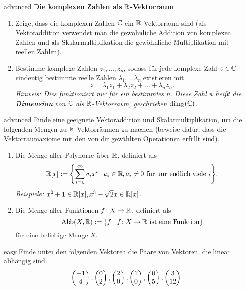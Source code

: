 \documentclass[]{uebungsblatt}
\begin{document}
    \begin{exercise}{advanced}
        \textbf{Die komplexen Zahlen als $\mathbb{R}$-Vektorraum}
        \begin{enumerate}
        \item Zeige, dass die komplexen Zahlen $\mathbb{C}$ ein $\mathbb{R}$-Vektorraum sind (als Vektoraddition verwendet man die
        gewöhnliche Addition von komplexen Zahlen und als Skalarmultiplikation die gewöhnliche Multiplikation mit
        reellen Zahlen).
        \item Bestimme komplexe Zahlen $z_1,\dots,z_n$, sodass für jede komplexe Zahl $z\in\mathbb{C}$ eindeutig bestimmte 
        reelle Zahlen $\lambda_1,\dots\lambda_n$ existieren mit
        \[z=\lambda_1z_1+\lambda_2z_2+\dots+\lambda_nz_n.\]
        \emph{Hinweis: Dies funktioniert nur für ein bestimmtes $n$. Diese Zahl $n$ heißt die \textbf{Dimension} 
        von $\mathbb{C}$ als $\mathbb{R}$-Vektorraum, geschrieben $\dim_{\mathbb{R}}(\mathbb{C})$.}
        \end{enumerate}
    \end{exercise}

    \begin{exercise}{advanced}
        Finde eine geeignete Vektoraddition und Skalarmultiplikation, um die folgenden Mengen zu $\mathbb{R}$-Vektorräumen zu 
        machen (beweise dafür, dass die Vektorraumaxiome mit den von dir gewählten Operationen erfüllt sind).
        \begin{enumerate}
            \item Die Menge aller Polynome über $\mathbb{R}$, definiert als 
            \[\mathbb{R}[x]:=\Biggl\{\sum_{i=0}^\infty a_ix^i\mid a_i\in\mathbb{R}, a_i\neq 0\text{ für nur endlich viele }i\Biggr\}.\]
            \emph{Beispiele: $x^2+1\in\mathbb{R}[x], x^3-\sqrt{2}x\in\mathbb{R}[x]$.}
            \item Die Menge aller Funktionen $f\colon X\rightarrow \mathbb{R}$, definiert als
            \[\text{Abb}(X,\mathbb{R}):=\{f\mid f\colon X\rightarrow\mathbb{R}\text{ ist eine Funktion}\}\]
            für eine beliebige Menge $X$.
        \end{enumerate}
    \end{exercise}

    \begin{exercise}{easy}
        Finde unter den folgenden Vektoren die Paare von Vektoren, die linear abhängig sind.
        \[\begin{pmatrix} -1\\ 4 \end{pmatrix}, \begin{pmatrix} 0\\ 2 \end{pmatrix}, \begin{pmatrix} 2\\ 0 \end{pmatrix}, \begin{pmatrix} 1\\ 0 \end{pmatrix}, \begin{pmatrix} 0\\ 5 \end{pmatrix}, \begin{pmatrix} 3\\ 12 \end{pmatrix}\]
    \end{exercise}

    \newpage
    
    
    \newpage
    
    \makehints
\end{document}
